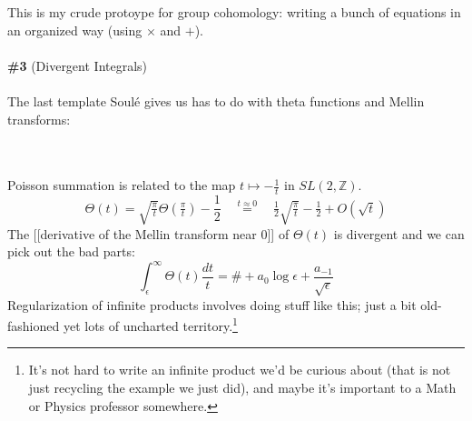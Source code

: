\documentclass[12pt]{article}
\begin{document}
This is my crude protoype for group cohomology: writing a bunch of equations in an organized way (using $\times$ and $+$). \\ \\
\textbf{\#3} (Divergent Integrals) \\ \\
The last template Soul\'{e} gives us has to do with theta functions and Mellin transforms: \\ \\
 \\ 
Poisson summation is related to the map $t \mapsto - \frac{1}{t}$ in $SL(2, \mathbb{Z})$. 
$$ \Theta(t) = \sqrt{\tfrac{\pi}{t}} \Theta(\tfrac{\pi}{t})  - \frac{1}{2} 
 \quad\stackrel{t\approx 0}{=}\quad \tfrac{1}{2}\sqrt{\tfrac{\pi}{t}} - \tfrac{1}{2}   + O(\sqrt{t})$$
The [[derivative of the Mellin transform near $0$]] of $\Theta(t)$ is divergent and we can pick out the bad parts:
$$ \int_\epsilon^\infty \Theta(t)  \frac{dt}{t}
 = \# + a_0 \log \epsilon + \frac{a_{-1}}{\sqrt{\epsilon}} $$
 Regularization of infinite products involves doing stuff like this; just a bit old-fashioned yet lots of uncharted territory.\footnote{It's not hard to write an infinite product we'd be curious about (that is not just recycling the example we just did), and maybe it's important to a Math or Physics professor somewhere.}

\newpage
\end{document}
